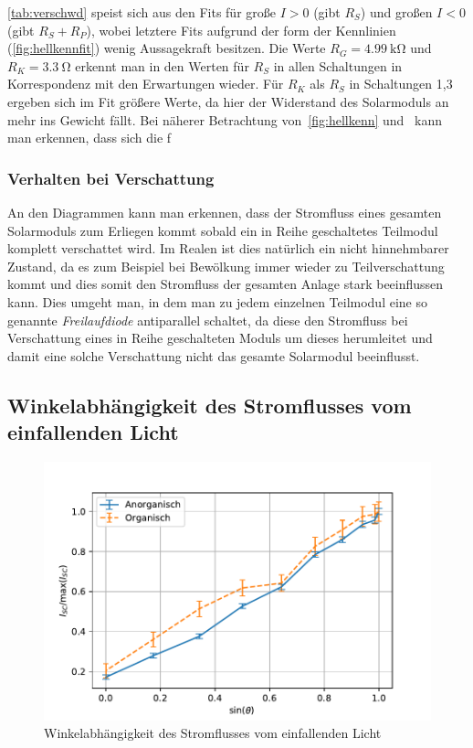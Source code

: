 \documentclass[slug=SZ, room=Hermann-Krone-Bau\,\ Labor\ 1.25, supervisor=Martin\ Kroll]{../../Lab_Report_LaTeX/lab_report}
\begin{document}
\ref{tab:verschwd} speist sich aus den Fits f\"ur gro\ss{}e \(I>0\)
(gibt \(R_S\)) und gro\ss{}en \(I<0\) (gibt \(R_S+R_P\)), wobei
letztere Fits aufgrund der form der Kennlinien (\ref{fig:hellkennfit})
wenig Aussagekraft besitzen. Die Werte
\(R_G=\SI{4.99}{\kilo\ohm}\) und \(R_K=\SI{3.3}{\ohm}\) erkennt man in
den Werten f\"ur \(R_S\) in allen Schaltungen in Korrespondenz mit den
Erwartungen wieder. F\"ur \(R_K\) als \(R_S\) in Schaltungen 1,3
ergeben sich im Fit gr\"o\ss{}ere Werte, da hier der Widerstand des
Solarmoduls an mehr ins Gewicht f\"allt. Bei n\"aherer Betrachtung
von~\ref{fig:hellkenn} und~ kann man erkennen, dass sich die f




\subsubsection{Verhalten bei Verschattung}
\label{sec:verschattung}

An den Diagrammen kann man erkennen, dass der Stromfluss eines gesamten Solarmoduls
zum Erliegen kommt sobald ein in Reihe geschaltetes Teilmodul komplett verschattet wird.
Im Realen ist dies natürlich ein nicht hinnehmbarer Zustand, da es zum Beispiel bei
Bewölkung immer wieder zu Teilverschattung kommt und dies somit den Stromfluss der gesamten
Anlage stark beeinflussen kann.
Dies umgeht man, in dem man zu jedem einzelnen Teilmodul eine so genannte \emph{Freilaufdiode}
antiparallel schaltet, da diese den Stromfluss bei Verschattung eines in Reihe geschalteten
Moduls um dieses herumleitet und damit eine solche Verschattung nicht das gesamte
Solarmodul beeinflusst.

\subsection{Winkelabhängigkeit des Stromflusses vom einfallenden Licht}
\label{sec:winkel}

\begin{figure}[H]\centering
        \includegraphics[width=.5\columnwidth]{figs/python/E/relativ.pdf}
        \caption{Winkelabhängigkeit des Stromflusses vom einfallenden Licht}
        \label{fig:winkel}
\end{figure}
\end{document}
